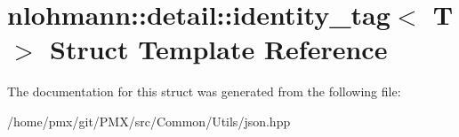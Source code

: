 \hypertarget{structnlohmann_1_1detail_1_1identity__tag}{}\section{nlohmann\+:\+:detail\+:\+:identity\+\_\+tag$<$ T $>$ Struct Template Reference}
\label{structnlohmann_1_1detail_1_1identity__tag}


The documentation for this struct was generated from the following file\+:\begin{DoxyCompactItemize}
\item 
/home/pmx/git/\+P\+M\+X/src/\+Common/\+Utils/json.\+hpp\end{DoxyCompactItemize}
